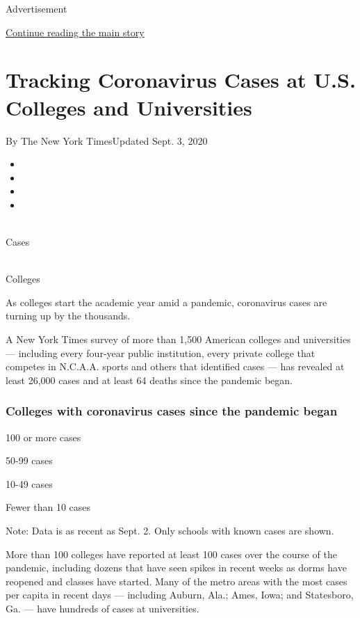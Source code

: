 Advertisement

\protect\hyperlink{after-top}{Continue reading the main story}

\hypertarget{tracking-coronavirus-cases-at-us-colleges-and-universities}{%
\section{Tracking Coronavirus Cases at U.S. Colleges and
Universities}\label{tracking-coronavirus-cases-at-us-colleges-and-universities}}

By The New York TimesUpdated Sept. 3, 2020

\begin{itemize}
\item
\item
\item
\item
\end{itemize}

~\\
Cases

\\
Colleges

As colleges start the academic year amid a pandemic, coronavirus cases
are turning up by the thousands.

A New York Times survey of more than 1,500 American colleges and
universities --- including every four-year public institution, every
private college that competes in N.C.A.A. sports and others that
identified cases --- has revealed at least 26,000 cases and at least 64
deaths since the pandemic began.

\hypertarget{colleges-with-coronavirus-cases-since-the-pandemic-began}{%
\subsubsection{Colleges with coronavirus cases since the pandemic
began}\label{colleges-with-coronavirus-cases-since-the-pandemic-began}}

100 or more cases

50-99 cases

10-49 cases

Fewer than 10 cases

Note: Data is as recent as Sept. 2. Only schools with known cases are
shown.

More than 100 colleges have reported at least 100 cases over the course
of the pandemic, including dozens that have seen spikes in recent weeks
as dorms have reopened and classes have started. Many of the metro areas
with the most cases per capita in recent days --- including Auburn,
Ala.; Ames, Iowa; and Statesboro, Ga. --- have hundreds of cases at
universities.

